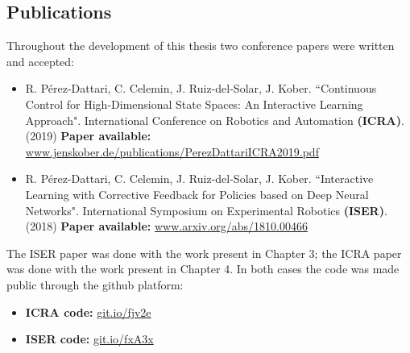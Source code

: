\begin{appendix2}
\section*{Publications}
Throughout the development of this thesis two conference papers were written and accepted:

\begin{itemize}
    \item R. Pérez-Dattari, C. Celemin, J. Ruiz-del-Solar, J. Kober. ``Continuous Control for High-Dimensional State Spaces: An Interactive Learning Approach". International Conference on Robotics and Automation \textbf{(ICRA)}. (2019) \cite{perez2019continuous}
    \newline\color{blue}\textbf{Paper available:} \color{black} \url{www.jenskober.de/publications/PerezDattariICRA2019.pdf}
    
    \vspace{0.5cm}
    
    \item R. Pérez-Dattari, C. Celemin, J. Ruiz-del-Solar, J. Kober. ``Interactive Learning with Corrective Feedback for Policies based on Deep Neural Networks". International Symposium on Experimental Robotics \textbf{(ISER)}. (2018) \cite{perez2018interactive}
    \newline\color{blue}\textbf{Paper available:} \color{black} \url{www.arxiv.org/abs/1810.00466}
\end{itemize}

The ISER paper was done with the work present in Chapter 3; the ICRA paper was done with the work present in Chapter 4. In both cases the code was made public through the github platform:

\begin{itemize}
    \item \textbf{ICRA code:} \url{git.io/fjv2e}
    
    \vspace{0.5cm}
    
    \item \textbf{ISER code:} \url{git.io/fxA3x}
\end{itemize}
\end{appendix2}